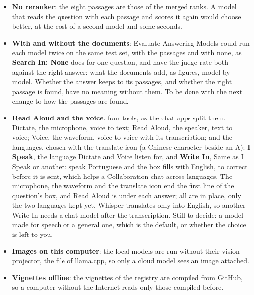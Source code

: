 \begin{itemize}
    meaning.
  \item \textbf{No reranker}: the eight passages are those of the merged ranks. A model that reads the question with
    each passage and scores it again would choose better, at the cost of a second model and some seconds.
  \item \textbf{With and without the documents}: Evaluate Answering Models could run each model twice on the same test
    set, with the passages and with none, as \textbf{Search In: None} does for one question, and have the judge rate
    both against the right answer: what the documents add, as figures, model by model. Whether the answer keeps to its
    passages, and whether the right passage is found, have no meaning without them. To be done with the next change
    to how the passages are found.
  \item \textbf{Read Aloud and the voice}: four tools, as the chat apps split them: Dictate, the microphone, voice to
    text; Read Aloud, the speaker, text to voice; Voice, the waveform, voice to voice with its transcription; and the
    languages, chosen with the translate icon (a Chinese character beside an A): \textbf{I Speak}, the language Dictate and Voice
    listen for, and \textbf{Write In}, Same as I Speak or another: speak Portuguese and the box fills with English, to
    correct before it is sent, which helps a Collaboration chat across languages. The microphone, the waveform and
    the translate icon end the first line of the question's box, and Read Aloud is under each answer;
    all are in place, only the two languages kept yet. Whisper translates only into English, so another Write In needs
    a chat model after the transcription. Still to decide: a model made for speech or a general one, which is the
    default, or whether the choice is left to you.
  \item \textbf{Images on this computer}: the local models are run without their vision projector, the
     file of llama.cpp, so only a cloud model sees an image attached.
  \item \textbf{Vignettes offline}: the vignettes of the registry are compiled from GitHub, so a computer without the
    Internet reads only those compiled before.
\end{itemize}

